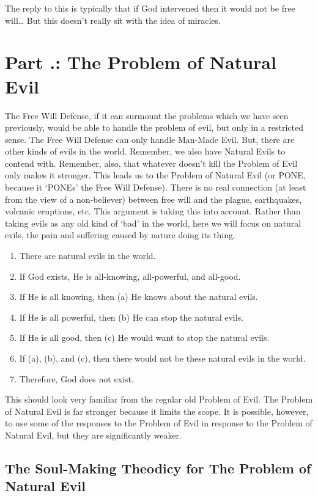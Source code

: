 The reply to this is typically that if God intervened then it would not be free will… But this doesn’t really sit with the idea of miracles.

\section{Part \thechapcount.\theseccount: The Problem of Natural Evil}
The Free Will Defense, if it can surmount the problems which we have seen previously, would be able to handle the problem of evil, but only in a restricted sense. The Free Will Defense can only handle Man-Made Evil. But, there are other kinds of evils in the world. Remember, we also have Natural Evils to contend with. Remember, also, that whatever doesn't kill the Problem of Evil only makes it stronger. This leads us to the Problem of Natural Evil (or PONE, because it `PONEs' the Free Will Defense). There is no real connection (at least from the view of a non-believer) between free will and the plague, earthquakes, volcanic eruptions, etc. This argument is taking this into account. Rather than taking evils as any old kind of `bad' in the world, here we will focus on natural evils, the pain and suffering caused by nature doing its thing. 
\begin{enumerate}
    \item There are natural evils in the world.
    \item If God exists, He is all-knowing, all-powerful, and all-good.
    \item If He is all knowing, then (a) He knows about the natural evils.
    \item If He is all powerful, then (b) He can stop the natural evils.
    \item If He is all good, then (c) He would want to stop the natural evils.
    \item If (a), (b), and (c), then there would not be these natural evils in the world.
    \item Therefore, God does not exist.
\end{enumerate}
This should look very familiar from the regular old Problem of Evil. The Problem of Natural Evil is far stronger because it limits the scope. It is possible, however, to use some of the responses to the Problem of Evil in response to the Problem of Natural Evil, but they are significantly weaker. 

\subsection{The Soul-Making Theodicy for The Problem of Natural Evil}

